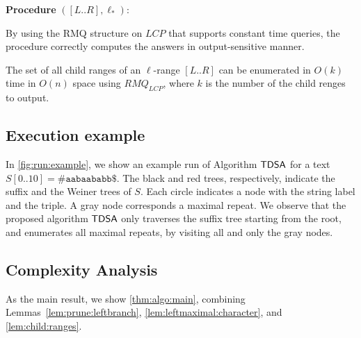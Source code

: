 {
\setlength{\interspacetitleruled}{0pt}%
\setlength{\algotitleheightrule}{0pt}%
\begin{algorithm}[h]
  \textbf{Procedure} $([L..R], \ell_*)$:\\  
\end{algorithm}
}

By using the RMQ structure on $LCP$ that supports constant time queries, the procedure correctly computes the answers in output-sensitive manner. 


\begin{lemma}
  The set of all child ranges of an $\ell$-range $[L..R]$ can be enumerated in $O(k)$ time in $O(n)$ space
  using $RMQ_{LCP}$, 
where $k$ is the number of the child renges to output.  
\end{lemma}


\subsection{Execution example}

In \cref{fig:run:example}, we show an example run of Algorithm $\textsf{TDSA}$ for a text $S[0..10] = \mathtt{\#aabaababb\$}$. The black and red trees, respectively, indicate the suffix and the Weiner trees of $S$. Each circle indicates a node with the string label and the triple. A gray node corresponds a maximal repeat. 
We observe that the proposed algorithm $\textsf{TDSA}$ only traverses the suffix tree starting from the root, and enumerates all maximal repeats, by visiting all and only the gray nodes. 


\subsection{Complexity Analysis}
As the main result, we show \cref{thm:algo:main}, 
combining Lemmas~\ref{lem:prune:leftbranch},
\ref{lem:leftmaximal:character}, and 
\ref{lem:child:ranges}.

